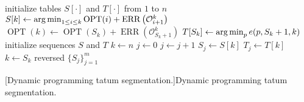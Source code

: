 \begin{algorithm}[ht!]
    \begin{algorithmic}[1]
        \State initialize tables $S[\cdot]$ and $T[\cdot]$ from $1$ to $n$
            \State $S[k]\gets \argmin_{1\leq i \leq k}\operatorname{OPT}(i)+\operatorname{ERR}\left(\mathcal{O}_{i+1}^k\right)$
            \State $\operatorname{OPT}(k)\gets \operatorname{OPT}(S_k)+\operatorname{ERR}\left(\mathcal{O}_{S_k+1}^k\right)$
            \State $T[S_k]\gets\argmin_p e(p,S_k+1,k)$
        \EndFor
        \State initialize sequences $S$ and $T$
        \State $k \gets n$
        \State $j \gets 0$
            \State $j \gets j + 1$
            \State $S_j \gets S[k]$
            \State $T_j \gets T[k]$
            \State $k \gets S_k$ 
        \EndWhile
        \State \Return reversed $\{S_j\}_{j=1}^m$
    \end{algorithmic}
    [Dynamic programming tatum segmentation.]{Dynamic programming tatum segmentation.}
\end{algorithm}